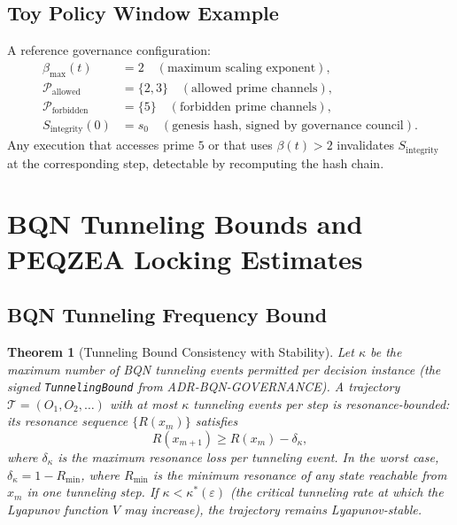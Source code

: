 \documentclass[11pt]{amsart}
\newtheorem{theorem}{Theorem}[section]
\begin{document}
\subsection{Toy Policy Window Example}

A reference governance configuration:
\begin{align*}
  \beta_{\max}(t) &= 2 \quad (\text{maximum scaling exponent}), \\
  \mathcal{P}_{\mathrm{allowed}} &= \{2, 3\} \quad (\text{allowed prime channels}), \\
  \mathcal{P}_{\mathrm{forbidden}} &= \{5\} \quad (\text{forbidden prime channels}), \\
  S_{\mathrm{integrity}}(0) &= s_0 \quad (\text{genesis hash, signed by governance council}).
\end{align*}
Any execution that accesses prime $5$ or that uses $\beta(t) > 2$ invalidates $S_{\mathrm{integrity}}$ at the corresponding step, detectable by recomputing the hash chain.

\section{BQN Tunneling Bounds and PEQZEA Locking Estimates}
\label{sec:quantum}

\subsection{BQN Tunneling Frequency Bound}

\begin{theorem}[Tunneling Bound Consistency with Stability]\label{thm:tunneling-bound}
Let $\kappa$ be the maximum number of BQN tunneling events permitted per decision instance (the signed \texttt{TunnelingBound} from ADR-BQN-GOVERNANCE). A trajectory $\mathcal{T} = (O_1, O_2, \ldots)$ with at most $\kappa$ tunneling events per step is \emph{resonance-bounded}: its resonance sequence $\{R(x_m)\}$ satisfies
\[
  R(x_{m+1}) \geq R(x_m) - \delta_\kappa,
\]
where $\delta_\kappa$ is the maximum resonance loss per tunneling event. In the worst case, $\delta_\kappa = 1 - R_{\min}$, where $R_{\min}$ is the minimum resonance of any state reachable from $x_m$ in one tunneling step. If $\kappa < \kappa^*(\varepsilon)$ (the critical tunneling rate at which the Lyapunov function $V$ may increase), the trajectory remains Lyapunov-stable.
\end{theorem}
\end{document}
